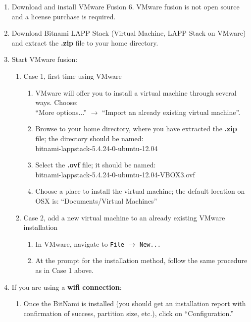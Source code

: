\begin{enumerate}
	\item Download and install VMware Fusion 6\footnotemark {}. VMware fusion is not open source and a license purchase is required.
	\item Download Bitnami LAPP Stack\footnotemark {} (Virtual Machine, LAPP Stack on VMware) and extract the \textbf{.zip} file to your home directory.
	\item Start VMware fusion:
		\begin{enumerate}
		\item Case 1, first time using VMware
			\begin{enumerate}
			\item VMware will offer you to install a virtual machine through several ways. Choose: \\ 
				``More options...'' $\rightarrow$ ``Import an already existing virtual machine''.
			\item Browse to your home directory, where you have extracted the \textbf{.zip} file; the directory should be named:\\ 
				bitnami-lappstack-5.4.24-0-ubuntu-12.04 
			\item Select the \textbf{.ovf} file; it should be named:\\ 
				bitnami-lappstack-5.4.24-0-ubuntu-12.04-VBOX3.ovf
			\item Choose a place to install the virtual machine; the default location on OSX is: ``Documents/Virtual Machines''
			\end{enumerate}
		\item Case 2, add a new virtual machine to an already existing VMware installation
			 \begin{enumerate}
			 \item In VMware, navigate to \texttt{File} $\rightarrow$ \texttt{New...}
			 \item At the prompt for the installation method, follow the same procedure as in Case 1 above.
			 \end{enumerate}
		\end{enumerate}
	\item If you are using a \textbf{wifi connection}:
		\begin{enumerate}
		\item Once the BitNami is installed (you should get an installation report with confirmation of success, partition size, etc.), click on ``Configuration.''

\end{enumerate}
\end{enumerate}
